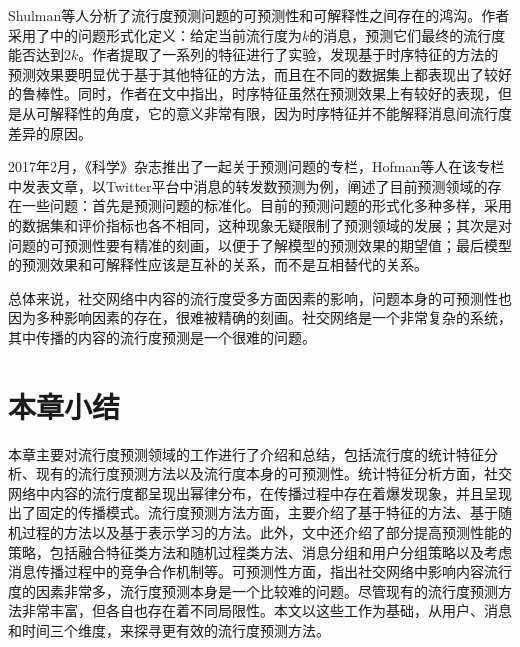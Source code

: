 Shulman等人\citep{shulman2016predictability}分析了流行度预测问题的可预测性和可解释性之间存在的鸿沟。作者采用了\citep{cheng2014can}中的问题形式化定义：给定当前流行度为$k$的消息，预测它们最终的流行度能否达到$2k$。作者提取了一系列的特征进行了实验，发现基于时序特征的方法的预测效果要明显优于基于其他特征的方法，而且在不同的数据集上都表现出了较好的鲁棒性。同时，作者在文中指出，时序特征虽然在预测效果上有较好的表现，但是从可解释性的角度，它的意义非常有限，因为时序特征并不能解释消息间流行度差异的原因。

2017年2月，《科学》杂志推出了一起关于预测问题的专栏\citep{Jasny468}，Hofman等人在该专栏中发表文章\citep{hofman2017prediction}，以Twitter平台中消息的转发数预测为例，阐述了目前预测领域的存在一些问题：首先是预测问题的标准化。目前的预测问题的形式化多种多样，采用的数据集和评价指标也各不相同，这种现象无疑限制了预测领域的发展；其次是对问题的可预测性要有精准的刻画，以便于了解模型的预测效果的期望值；最后模型的预测效果和可解释性应该是互补的关系，而不是互相替代的关系。

总体来说，社交网络中内容的流行度受多方面因素的影响，问题本身的可预测性也因为多种影响因素的存在，很难被精确的刻画。社交网络是一个非常复杂的系统，其中传播的内容的流行度预测是一个很难的问题。

\section{本章小结}
本章主要对流行度预测领域的工作进行了介绍和总结，包括流行度的统计特征分析、现有的流行度预测方法以及流行度本身的可预测性。统计特征分析方面，社交网络中内容的流行度都呈现出幂律分布，在传播过程中存在着爆发现象，并且呈现出了固定的传播模式。流行度预测方法方面，主要介绍了基于特征的方法、基于随机过程的方法以及基于表示学习的方法。此外，文中还介绍了部分提高预测性能的策略，包括融合特征类方法和随机过程类方法、消息分组和用户分组策略以及考虑消息传播过程中的竞争合作机制等。可预测性方面，指出社交网络中影响内容流行度的因素非常多，流行度预测本身是一个比较难的问题。尽管现有的流行度预测方法非常丰富，但各自也存在着不同局限性。本文以这些工作为基础，从用户、消息和时间三个维度，来探寻更有效的流行度预测方法。